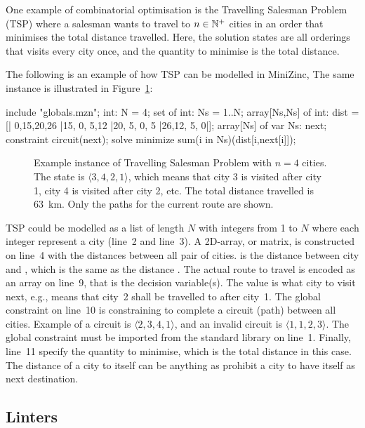 \documentclass[a4paper,12pt]{article}
\begin{document}
One example of combinatorial optimisation is the Travelling Salesman Problem (TSP) where a
salesman wants to travel to $n \in \mathbb{N}^+$ cities in an order that minimises the total
distance travelled. Here, the solution states are all orderings that visits every city once, and the
quantity to minimise is the total distance.

The following is an example of how TSP can be modelled in MiniZinc,
The same instance is illustrated in Figure~\ref{fig:tsp}:
\begin{mznbreak}
include "globals.mzn";
int: N = 4;
set of int: Ns = 1..N;
array[Ns,Ns] of int: dist =
  [| 0,15,20,26
   |15, 0, 5,12
   |20, 5, 0, 5
   |26,12, 5, 0|];
array[Ns] of var Ns: next;
constraint circuit(next);
solve minimize sum(i in Ns)(dist[i,next[i]]);
\end{mznbreak}

\begin{figure}[ht]
  \centering
  
  \caption{Example instance of Travelling Salesman Problem with $n=4$ cities. The state is
    $\langle 3,4,2,1 \rangle$, which means that city 3 is visited after city 1, city 4 is
    visited after city 2, etc. The total distance travelled is \SI{63}{km}. Only the paths
    for the current route are shown.}%
  \label{fig:tsp}
\end{figure}

TSP could be modelled as a list of length $N$ with integers from 1 to $N$ where each
integer represent a city (line~2 and line~3). A 2D-array, or matrix, is constructed on
line~4 with the distances between all pair of cities.  is the distance
between city  and , which is the same as the distance . The
actual route to travel is encoded as an array on line~9, that is the decision variable(s).
The value  is what city to visit next, e.g.,  means that
city~2 shall be travelled to after city~1. The global constraint  on line~10
is constraining  to complete a circuit (path) between all cities. Example of a
circuit is $\langle 2,3,4,1 \rangle$, and an invalid circuit is $\langle 1,1,2,3 \rangle$.
The global constraint must be imported from the standard library on line~1. Finally,
line~11 specify the quantity to minimise, which is the total distance in this case. The
distance of a city to itself can be anything as  prohibit a city to have
itself as next destination.

\subsection{Linters}\label{sec:bkg:linter}
\end{document}

